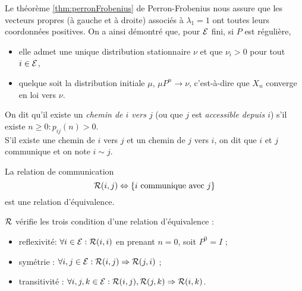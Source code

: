 \remark
Le théorème \ref{thm:perronFrobenius} de Perron-Frobenius nous assure que les vecteurs propres (à gauche et à droite) associés à $\lambda_1 = 1$ ont toutes leurs coordonnées positives. On a ainsi démontré que, pour $\mathcal{E}$ fini, si $P$ est régulière, 
\begin{itemize}
  \item elle admet une unique distribution stationnaire $\nu$ et que $\nu_i > 0$ pour tout $i \in \mathcal{E}$, 
  \item quelque soit la distribution initiale $\mu$, $\mu P^n \to \nu$, c'est-à-dire que $X_n$ converge en loi vers $\nu$.
\end{itemize}


\begin{definition}
  On dit qu'il existe un {\em chemin de $i$ vers $j$} (ou que $j$ est {\em accessible depuis $i$}) s'il existe $n \geq 0: p_{ij}(n) > 0$. \\
  S'il existe une chemin de $i$ vers $j$ et un chemin de $j$ vers $i$, on dit que $i$ et $j$ communique et on note $i \sim j$.
\end{definition}


\begin{proposition}  \label{prop:communicationEquivalence}
  La relation de communication 
  $$
  \mathcal{R}(i, j) \Leftrightarrow \{\text{$i$ communique avec $j$}\}
  $$
  est une relation d'équivalence. 
\end{proposition}

\proof
$\mathcal{R}$ vérifie les trois condition d'une relation d'équivalence : 
\begin{itemize}
  \item reflexivité: $\forall i \in \mathcal{E}: \mathcal{R}(i, i)$ en prenant $n = 0$, soit $P^0 = I$ ;
  \item symétrie : $\forall i, j \in \mathcal{E}: \mathcal{R}(i, j) \Rightarrow \mathcal{R}(j, i)$ ;
  \item transitivité : $\forall i, j, k \in \mathcal{E}: \mathcal{R}(i, j), \mathcal{R}(j, k) \Rightarrow \mathcal{R}(i, k)$.
\end{itemize}
\eproof

